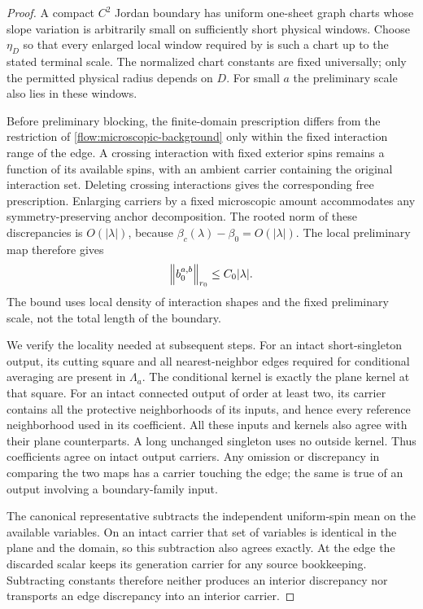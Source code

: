 \begin{proof}
A compact $C^2$ Jordan boundary has uniform one-sheet graph charts
whose slope variation is arbitrarily small on sufficiently short
physical windows.  Choose $\eta_D$ so that every enlarged local
window required by  is such a chart up to the stated
terminal scale.  The normalized chart constants are fixed universally;
only the permitted physical radius depends on $D$.  For small $a$
the preliminary scale also lies in these windows.

Before preliminary blocking, the finite-domain prescription differs
from the restriction of \eqref{flow:microscopic-background} only
within the fixed interaction range of the edge.  A crossing interaction
with fixed exterior spins remains a function of its available spins,
with an ambient carrier containing the original interaction set.
Deleting crossing interactions gives the corresponding free prescription.
Enlarging carriers by a fixed microscopic amount accommodates any
symmetry-preserving anchor decomposition.  The rooted norm of these
discrepancies is $O(|\lambda|)$, because
$\beta_c(\lambda)-\beta_0=O(|\lambda|)$.  The local preliminary map
therefore gives
\begin{equation}\label{flow:boundary-initial}
                    \left\|b_0^{a,b}\right\|_{r_0}\le C_0|\lambda|.
\end{equation}
The bound uses local density of interaction shapes and the fixed
preliminary scale, not the total length of the boundary.

We verify the locality needed at subsequent steps.  For an intact
short-singleton output, its cutting square and all nearest-neighbor
edges required for conditional averaging are present in $\Lambda_a$.
The conditional kernel is exactly the plane kernel at that square.
For an intact connected output of order at least two, its carrier
contains all the protective neighborhoods of its inputs, and hence
every reference neighborhood used in its coefficient.  All these
inputs and kernels also agree with their plane counterparts.  A long
unchanged singleton uses no outside kernel.  Thus coefficients agree
on intact output carriers.  Any omission or discrepancy in comparing
the two maps has a carrier touching the edge; the same is true of
an output involving a boundary-family input.

The canonical representative subtracts the independent uniform-spin
mean on the available variables.  On an intact carrier that set of
variables is identical in the plane and the domain, so this subtraction
also agrees exactly.  At the edge the discarded scalar keeps its
generation carrier for any source bookkeeping.  Subtracting constants
therefore neither produces an interior discrepancy nor transports an
edge discrepancy into an interior carrier.


\end{proof}
